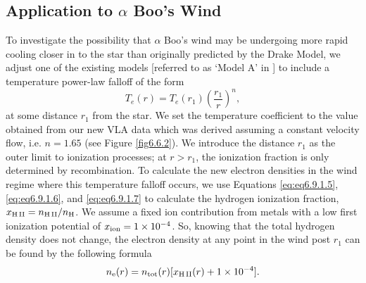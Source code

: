\subsection{Application to $\alpha$ Boo's Wind}\label{sec:6.6.2}
To investigate the possibility that $\alpha$ Boo's wind may be undergoing more rapid cooling closer in to the star than originally predicted by the Drake Model, we adjust one of the existing models [referred to as `Model A' in \cite{drake_1985}] to include a temperature power-law falloff of the form
\begin{equation}
T_{e}(r)= T_{e}(r_{1})\left(\frac{r_{1}}{r}\right)^{n},
\label{eq:eq2}
\end{equation}
at some distance $r_{1}$ from the star. We set the temperature coefficient to the value obtained from our new VLA data which was derived assuming a constant velocity flow, i.e. $n=1.65$ (see Figure \ref{fig6.6.2}). We introduce the distance $r_{1}$ as the outer limit to ionization processes; at $r > r_{1}$, the ionization fraction is only determined by recombination. To calculate the new electron densities in the wind regime where this temperature falloff occurs, we use Equations \ref{eq:eq6.9.1.5}, \ref{eq:eq6.9.1.6}, and \ref{eq:eq6.9.1.7} to calculate the hydrogen ionization fraction, $x_{\rm{H \, II}}=n_{\rm{H \, II}}/n_{\rm{H}}$. We assume a fixed ion contribution from metals with a low first ionization potential of $x_{\rm{ion}} = 1 \times 10^{-4}$. So, knowing that the total hydrogen density does not change, the electron density at any point in the wind post $r_1$ can be found by the following formula
\begin{equation}
n_{\rm{e}}(r)=n_{\rm{tot}}(r)[x_{\rm{H \, II}}(r) + 1\times 10^{-4}].
\end{equation}

